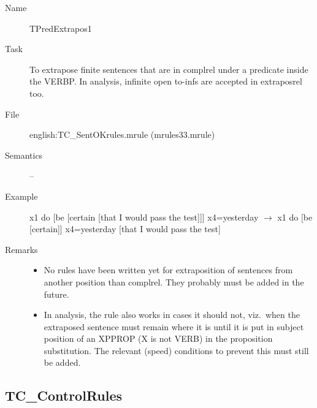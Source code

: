 \begin{description}
\vspace{1 cm}
\begin{description}
\item[Name] TPredExtrapos1
\item[Task] To extrapose finite sentences that are in complrel under a 
predicate inside the VERBP. 
In analysis, infinite open to-infs are accepted in extraposrel too.
 \item[File] english:TC\_SentOKrules.mrule (mrules33.mrule)
\item[Semantics] --
\item[Example] x1 do [be [certain [that I would pass the test]]] x4=yesterday 
$\rightarrow$
x1 do [be [certain]] x4=yesterday [that I would pass the test]
\item[Remarks] \mbox{}
\begin{itemize}
\item No rules have been written yet for extraposition of sentences from 
another position than complrel. They probably must be added in the future.
\item In analysis, the rule also works in cases it should not, viz.\ when the 
extraposed sentence must remain where it is until it is put in subject position 
of an XPPROP (X is not VERB) in the proposition substitution. The relevant 
(speed) conditions to prevent this must still be added. 
\end{itemize}
\end{description}

\end{description}

\newpage
\subsection{TC\_ControlRules} 

